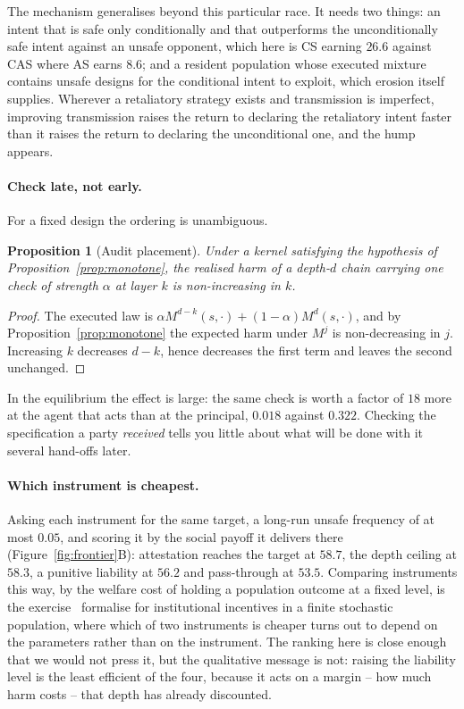 \documentclass[11pt,a4paper]{article}
\newtheorem{proposition}[theorem]{Proposition}
\theoremstyle{definition}
\newcommand{\AS}{\textsf{AS}}
\newcommand{\CS}{\textsf{CS}}
\newcommand{\CAS}{\textsf{CAS}}
\begin{document}
The mechanism generalises beyond this particular race. It needs two things: an
intent that is safe only conditionally and that outperforms the unconditionally
safe intent against an unsafe opponent, which here is \CS{} earning $26.6$
against \CAS{} where \AS{} earns $8.6$; and a resident population whose
executed mixture contains unsafe designs for the conditional intent to exploit,
which erosion itself supplies. Wherever a retaliatory strategy exists and
transmission is imperfect, improving transmission raises the return to
declaring the retaliatory intent faster than it raises the return to declaring
the unconditional one, and the hump appears.

\paragraph{Check late, not early.}
For a fixed design the ordering is unambiguous.

\begin{proposition}[Audit placement]
\label{prop:audit}
Under a kernel satisfying the hypothesis of Proposition~\ref{prop:monotone},
the realised harm of a depth-$d$ chain carrying one check of strength $\alpha$
at layer $k$ is non-increasing in $k$.
\end{proposition}

\begin{proof}
The executed law is $\alpha M^{d-k}(s,\cdot)+(1-\alpha)M^{d}(s,\cdot)$, and by
Proposition~\ref{prop:monotone} the expected harm under $M^{j}$ is
non-decreasing in $j$. Increasing $k$ decreases $d-k$, hence decreases the first
term and leaves the second unchanged.
\end{proof}

In the equilibrium the effect is large: the same check is worth a factor of
$18$ more at the agent that acts than at the principal, $0.018$ against
$0.322$. Checking the specification a party \emph{received} tells you little
about what will be done with it several hand-offs later.

\paragraph{Which instrument is cheapest.}
Asking each instrument for the same target, a long-run unsafe frequency of at
most $0.05$, and scoring it by the social payoff it delivers there
(Figure~\ref{fig:frontier}B): attestation reaches the target at $58.7$, the
depth ceiling at $58.3$, a punitive liability at $56.2$ and pass-through at
$53.5$. Comparing instruments this way, by the welfare cost of holding a
population outcome at a fixed level, is the exercise~\citet{duong2021cost}
formalise for institutional incentives in a finite stochastic population, where
which of two instruments is cheaper turns out to depend on the parameters
rather than on the instrument.
The ranking here is close enough that we would not press it, but the
qualitative message is not: raising the liability level is the least efficient
of the four, because it acts on a margin -- how much harm costs -- that
depth has already discounted.
\end{document}

